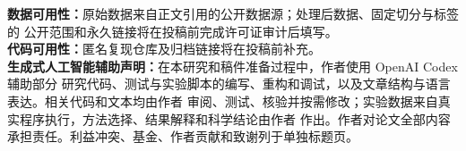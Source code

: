 \documentclass[UTF8,a4paper,10pt,twocolumn]{ctexart}
\begin{document}
\noindent\textbf{数据可用性：}原始数据来自正文引用的公开数据源；处理后数据、固定切分与标签的
公开范围和永久链接将在投稿前完成许可证审计后填写。\\[0.6em]
\textbf{代码可用性：}匿名复现仓库及归档链接将在投稿前补充。\\[0.6em]
\textbf{生成式人工智能辅助声明：}在本研究和稿件准备过程中，作者使用 OpenAI Codex 辅助部分
研究代码、测试与实验脚本的编写、重构和调试，以及文章结构与语言表达。相关代码和文本均由作者
审阅、测试、核验并按需修改；实验数据来自真实程序执行，方法选择、结果解释和科学结论由作者
作出。作者对论文全部内容承担责任。利益冲突、基金、作者贡献和致谢列于单独标题页。

\begingroup
\small


\endgroup
\end{document}
